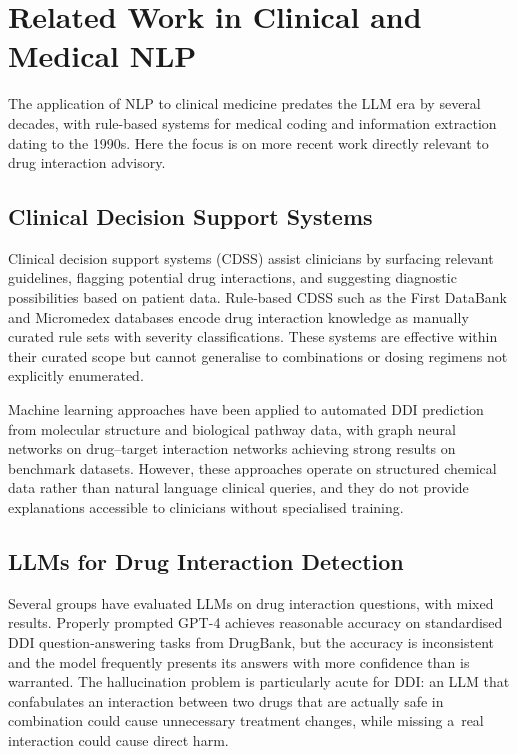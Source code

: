 \section{Related Work in Clinical and Medical NLP}
\label{sec:medical_nlp}

The application of NLP to clinical medicine predates the LLM era by several decades,
with rule-based systems for medical coding and information extraction dating to the 1990s.
Here the focus is on more recent work directly relevant to drug interaction advisory.

\subsection{Clinical Decision Support Systems}

Clinical decision support systems (CDSS) assist clinicians by surfacing relevant
guidelines, flagging potential drug interactions, and suggesting diagnostic
possibilities based on patient data.
Rule-based CDSS such as the First DataBank and Micromedex databases encode drug
interaction knowledge as manually curated rule sets with severity classifications.
These systems are effective within their curated scope but cannot generalise to
combinations or dosing regimens not explicitly enumerated.

Machine learning approaches have been applied to automated DDI prediction from
molecular structure and biological pathway data, with graph neural networks on
drug--target interaction networks achieving strong results on benchmark datasets.
However, these approaches operate on structured chemical data rather than natural
language clinical queries, and they do not provide explanations accessible to
clinicians without specialised training.

\subsection{LLMs for Drug Interaction Detection}

Several groups have evaluated LLMs on drug interaction questions, with mixed results.
Properly prompted GPT-4 achieves reasonable accuracy on standardised DDI
question-answering tasks from DrugBank, but the accuracy is inconsistent and
the model frequently presents its answers with more confidence than is warranted.
The hallucination problem is particularly acute for DDI: an LLM that
confabulates an interaction between two drugs that are actually safe in combination
could cause unnecessary treatment changes, while missing a~real interaction could
cause direct harm.

